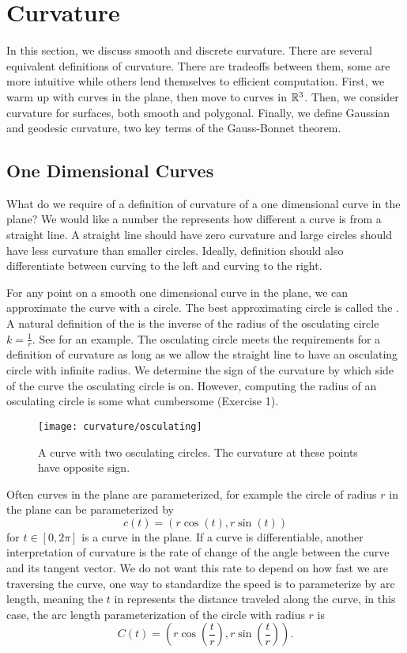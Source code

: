 \section{Curvature}
\label{sec:curvature}

In this section, we discuss smooth and discrete curvature. There are several
equivalent definitions of curvature. There are tradeoffs between them,
some are more intuitive while others lend themselves to efficient computation.
First, we warm up with curves in the plane, then move to curves in $\mathbb{R}^3$.
Then, we consider curvature for surfaces, both smooth and polygonal.
Finally, we define Gaussian and geodesic
curvature, two key terms of the Gauss-Bonnet theorem.

\subsection{One Dimensional Curves}

What do we require of a definition of curvature of a one dimensional curve
in the plane? We would like a number the represents how 
different a curve is from a straight line.
A straight line should have zero curvature and
 large circles should have less curvature than smaller circles.
Ideally, definition should also differentiate between
curving to the left and curving to the right.


For any point on a smooth one dimensional curve in the plane,
we can approximate the curve with a circle.
The best approximating circle is called the  .
A natural definition of the  is the inverse of the radius of the osculating
 circle $k=\frac{1}{r}$.
See  for an example.
The osculating circle meets the requirements for a definition of curvature as long
as we allow the straight line to have an osculating circle with infinite radius.
We determine the sign of the curvature by which side of the curve the osculating circle is on.
However, computing the radius of an osculating circle is some what cumbersome (Exercise 1).

\begin{figure}[htb]
	\centering
	\texttt{[image: curvature/osculating]}
	\caption{A curve with two osculating circles. The curvature at these points
	have opposite sign.}
	\label{fig:osculating-circle}
\end{figure}

Often curves in the plane are parameterized, for example
the circle of radius $r$ in the plane can be parameterized by
$$c(t)=(r\cos(t),r\sin(t))$$
 for $t\in [0,2\pi]$ is a curve in the plane.
If a curve is differentiable, another interpretation of curvature 
is the rate of change
of the angle between the curve and its tangent vector. 
We do not want this
rate to depend on how fast we are traversing the curve, one way to standardize
the speed is to parameterize by arc length, meaning the $t$ in  represents 
the distance traveled along the curve, in this case, the arc length parameterization
of the circle with radius $r$ is $$C(t)=\left(r\cos\left(\frac{t}{r}\right),r\sin\left(\frac{t}{r}\right)\right).$$

